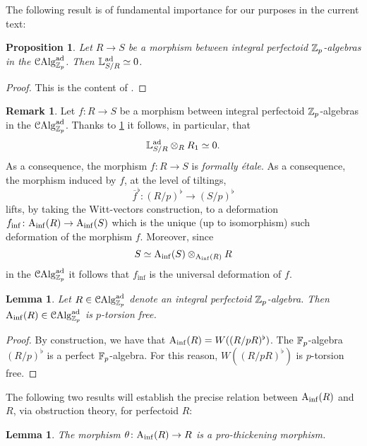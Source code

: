 \documentclass[10pt,a4paper]{amsart}
\numberwithin{equation}{subsection}
\newtheorem{lemma}[theorem]{Lemma}
\newtheorem{proposition}[theorem]{Proposition}
\theoremstyle{definition}
\newtheorem{remark}[theorem]{Remark}
\begin{document}
The following result is of fundamental importance for our purposes in the current text:

\begin{proposition} \label{prop_non_obs_perf}
    Let $R \to S$ be a morphism between integral perfectoid $\mathbb Z_p$-algebras in the \infcat $\mathcal C \mathrm{Alg}^{\mathrm{ad}}_{\mathbb Z_p}$. Then $\mathbb{L}^{\mathrm{ad}}_{S/R} \simeq 0$.
\end{proposition}

\begin{proof}
    This is the content of \cite[Proposition 3.14]{bhatt2018integral}.
\end{proof}

\begin{remark}
    Let $f \colon R \to S$ be a morphism between integral perfectoid $\mathbb Z_p$-algebras in the \infcat $\mathcal C \mathrm{Alg}^{\mathrm{ad}}_{\mathbb Z_p}$. Thanks to \cref{prop_non_obs_perf} it follows, in particular, that
        \[
                \mathbb{L}^{\mathrm{ad}}_{S/ R} \otimes_{R} R_1 \simeq 0  .
        \]
    As a consequence, the morphism $f \colon R \to S$ is \emph{formally \'etale}. As a consequence, the morphism induced by $f $, at the level of tiltings,
        \[
               \overline{f}^\flat \colon (R/p)^\flat   \to (S/ p)^\flat
        \]
    lifts, by taking the Witt-vectors construction, to a deformation $f_\mathrm{inf} \colon \mathrm{A}_{\mathrm{inf}}(R) \to \mathrm{A}_{\mathrm{inf}}(S)$ which is the unique (up to isomorphism) such deformation of the morphism $f$. Moreover, since 
        \[
            S \simeq \mathrm{A}_{\mathrm{inf}}(S) \otimes_{\mathrm{A}_{\mathrm{inf}}(R)} R
        \]
    in the \infcat $\mathcal C \mathrm{Alg}^{\mathrm{ad}}_{\mathbb Z_p}$ it follows that $f_{\inf}$ is the universal
    deformation of $f$.
\end{remark}

\begin{lemma}
    Let $R \in \mathcal C \mathrm{Alg}^{\mathrm{ad}}_{\mathbb Z_p}$ denote an integral perfectoid $\mathbb Z_p$-algebra. Then $\mathrm{A}_{\mathrm{inf}}(R) \in \mathcal C \mathrm{Alg}^{\mathrm{ad}}_{\mathbb Z_p}$ is $p$-torsion free.
\end{lemma}

\begin{proof}
    By construction, we have that $\mathrm{A}_{\mathrm{inf}}(R) = W((R/pR)^\flat)$. The $\mathbb F_p$-algebra $(R/p)^\flat$ is a perfect $\mathbb F_p$-algebra. For this reason, $W((R/pR)^\flat)$ is $p$-torsion free.
\end{proof}

The following two results will establish the precise relation between $\mathrm{A}_{\mathrm{inf}}(R) $ and $R$, via obstruction theory, for perfectoid $R$:

\begin{lemma}
    The morphism $\theta \colon \mathrm{A}_{\mathrm{inf}}(R) \to R$ is a pro-thickening morphism.
\end{lemma}
\end{document}

